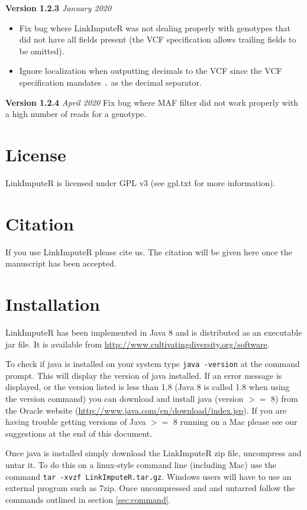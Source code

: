 \documentclass[10pt]{report}
\begin{document}
\textbf{Version 1.2.3} \textit{January 2020}
\begin{itemize}
    \item Fix bug where LinkImputeR was not dealing properly with genotypes that did not have all fields present (the VCF specification allows trailing fields to be omitted).
    \item Ignore localization when outputting decimals to the VCF since the VCF specification mandates \texttt{.} as the decimal separator.
\end{itemize}

\textbf{Version 1.2.4} \textit{April 2020} Fix bug where MAF filter did not work properly with a high number of reads for a genotype.



\section{License}

LinkImputeR is licensed under GPL v3 (see gpl.txt for more information).

\section{Citation}

If you use LinkImputeR please cite us.  The citation will be given here once the manuscript has been accepted.


\section{Installation}

LinkImputeR has been implemented in Java 8 and is distributed as an executable jar file.  It is available from \url{http://www.cultivatingdiversity.org/software}.

To check if java is installed on your system type \texttt{java -version} at the command prompt.  This will display the version of java installed.  If an error message is displayed, or the version listed is less than 1.8 (Java 8 is called 1.8 when using the version command) you can download and install java (version $>=$ 8) from the Oracle website (\url{http://www.java.com/en/download/index.jsp}).  If you are having trouble getting versions of Java $>=$ 8 running on a Mac please see our suggestions at the end of this document.

Once java is installed simply download the LinkImputeR zip file, uncompress and untar it.  To do this on a linux-style command line (including Mac) use the command \texttt{tar -xvzf LinkImputeR.tar.gz}.  Windows users will have to use an external program such as 7zip.  Once uncompressed and and untarred follow the commands outlined in section \ref{sec:command}.
\end{document}
